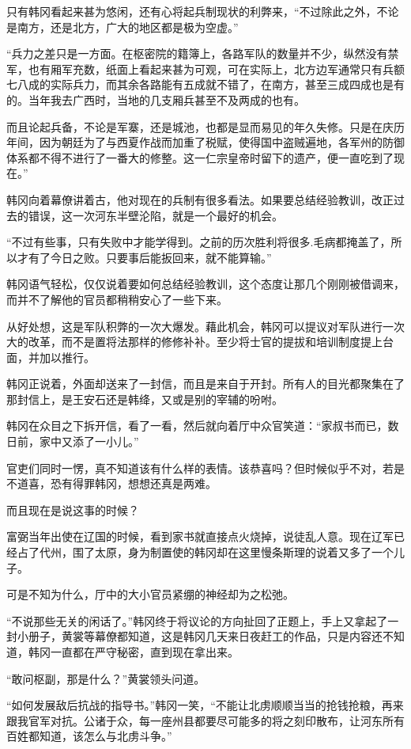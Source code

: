 只有韩冈看起来甚为悠闲，还有心将起兵制现状的利弊来，“不过除此之外，不论是南方，还是北方，广大的地区都是极为空虚。”

“兵力之差只是一方面。在枢密院的籍簿上，各路军队的数量并不少，纵然没有禁军，也有厢军充数，纸面上看起来甚为可观，可在实际上，北方边军通常只有兵额七八成的实际兵力，而其余各路能有五成就不错了，在南方，甚至三成四成也是有的。当年我去广西时，当地的几支厢兵甚至不及两成的也有。

而且论起兵备，不论是军寨，还是城池，也都是显而易见的年久失修。只是在庆历年间，因为朝廷为了与西夏作战而加重了税赋，使得国中盗贼遍地，各军州的防御体系都不得不进行了一番大的修整。这一仁宗皇帝时留下的遗产，便一直吃到了现在。”

韩冈向着幕僚讲着古，他对现在的兵制有很多看法。如果要总结经验教训，改正过去的错误，这一次河东半壁沦陷，就是一个最好的机会。

“不过有些事，只有失败中才能学得到。之前的历次胜利将很多.毛病都掩盖了，所以才有了今日之败。只要事后能扳回来，就不能算输。”

韩冈语气轻松，仅仅说着要如何总结经验教训，这个态度让那几个刚刚被借调来，而并不了解他的官员都稍稍安心了一些下来。

从好处想，这是军队积弊的一次大爆发。藉此机会，韩冈可以提议对军队进行一次大的改革，而不是置将法那样的修修补补。至少将士官的提拔和培训制度提上台面，并加以推行。

韩冈正说着，外面却送来了一封信，而且是来自于开封。所有人的目光都聚集在了那封信上，是王安石还是韩绛，又或是别的宰辅的吩咐。

韩冈在众目之下拆开信，看了一看，然后就向着厅中众官笑道：“家叔书而已，数日前，家中又添了一小儿。”

官吏们同时一愣，真不知道该有什么样的表情。该恭喜吗？但时候似乎不对，若是不道喜，恐有得罪韩冈，想想还真是两难。

而且现在是说这事的时候？

富弼当年出使在辽国的时候，看到家书就直接点火烧掉，说徒乱人意。现在辽军已经占了代州，围了太原，身为制置使的韩冈却在这里慢条斯理的说着又多了一个儿子。

可是不知为什么，厅中的大小官员紧绷的神经却为之松弛。

“不说那些无关的闲话了。”韩冈终于将议论的方向扯回了正题上，手上又拿起了一封小册子，黄裳等幕僚都知道，这是韩冈几天来日夜赶工的作品，只是内容还不知道，韩冈一直都在严守秘密，直到现在拿出来。

“敢问枢副，那是什么？”黄裳领头问道。

“如何发展敌后抗战的指导书。”韩冈一笑，“不能让北虏顺顺当当的抢钱抢粮，再来跟我官军对抗。公诸于众，每一座州县都要尽可能多的将之刻印散布，让河东所有百姓都知道，该怎么与北虏斗争。”

